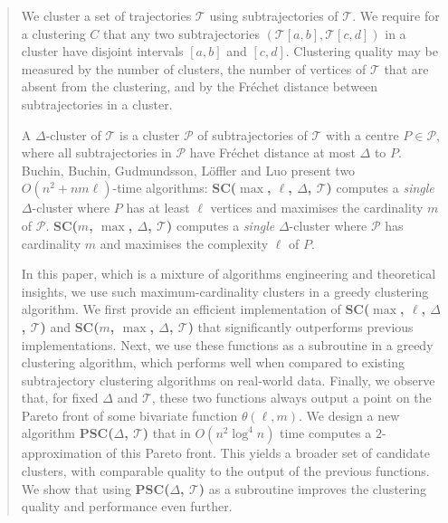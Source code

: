 \documentclass[english, thm-restate]{lipics-v2021}
\begin{document}
\begin{abstract}
We cluster a set of trajectories $\mathcal{T}$ using subtrajectories of $\mathcal{T}$. We require for a clustering $C$ that any two subtrajectories $(\mathcal{T}[a, b], \mathcal{T}[c, d])$ in a cluster have disjoint intervals $[a,b]$ and $[c, d]$.
Clustering quality may be measured by the number of clusters, the number of vertices of $\mathcal{T}$ that are absent from the clustering, and by the Fr\'{e}chet distance between subtrajectories in a cluster. 

 A $\Delta$-cluster of $\mathcal{T}$ is a cluster ${\mathcal{P}}$ of subtrajectories  of $\mathcal{T}$ with a centre $P \in {\mathcal{P}}$, where all subtrajectories in ${\mathcal{P}}$ have Fr\'{e}chet distance at most $\Delta$ to $P$. Buchin, Buchin, Gudmundsson, L\"{o}ffler and Luo  present two $O(n^2 + n m \ell)$-time algorithms: \textbf{SC($\max$, $\ell$, $\Delta$, $\mathcal{T}$)} computes a \emph{single} $\Delta$-cluster where
 $P$ has at least $\ell$ vertices and maximises the cardinality $m$ of ${\mathcal{P}}$.
 \textbf{SC($m$, $\max$, $\Delta$, $\mathcal{T}$)} computes a \emph{single} $\Delta$-cluster where  ${\mathcal{P}}$ has cardinality $m$ and maximises the complexity $\ell$ of $P$. 
 
 In this paper, which is a mixture of algorithms engineering and theoretical insights, we use such maximum-cardinality clusters in a greedy clustering algorithm. 
We first provide an efficient implementation of \textbf{SC($\max$, $\ell$, $\Delta$, $\mathcal{T}$)} and \textbf{SC($m$, $\max$, $\Delta$, $\mathcal{T}$)} that significantly outperforms previous implementations. 
Next, we use these functions as a subroutine in a greedy clustering algorithm, which performs well when compared to existing subtrajectory clustering algorithms on real-world data.  
Finally, we observe that, for fixed $\Delta$ and $\mathcal{T}$, these two functions always output a point on the Pareto front of some bivariate function $\theta(\ell, m)$.
We design a new algorithm \textbf{PSC($\Delta$, $\mathcal{T}$)} that in $O( n^2 \log^4 n)$ time computes a $2$-approximation of this Pareto front. This yields a broader set of candidate clusters, with comparable quality to the output of the previous functions.
We show that using \textbf{PSC($\Delta$, $\mathcal{T}$)} as a subroutine improves the clustering quality and performance even further.
\end{abstract}


\clearpage 

\newpage
\end{document}
